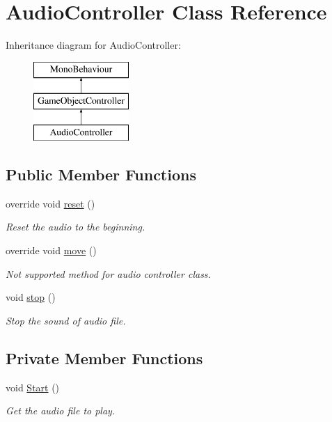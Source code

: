 \hypertarget{class_audio_controller}{}\section{Audio\+Controller Class Reference}
\label{class_audio_controller}
Inheritance diagram for Audio\+Controller\+:\begin{figure}[H]
\begin{center}
\leavevmode
\includegraphics[height=3.000000cm]{class_audio_controller}
\end{center}
\end{figure}
\subsection*{Public Member Functions}
\begin{DoxyCompactItemize}
\item 
override void \hyperlink{class_audio_controller_a20e52c6c93067e734270bbd3e1da204f}{reset} ()
\begin{DoxyCompactList}\small\item\em Reset the audio to the beginning. \end{DoxyCompactList}\item 
override void \hyperlink{class_audio_controller_af4b01a95141dabb50d0bc39cc3abb4e6}{move} ()
\begin{DoxyCompactList}\small\item\em Not supported method for audio controller class. \end{DoxyCompactList}\item 
void \hyperlink{class_audio_controller_aeac4b18138013f602f8f1d67cb5daa2e}{stop} ()
\begin{DoxyCompactList}\small\item\em Stop the sound of audio file. \end{DoxyCompactList}\end{DoxyCompactItemize}
\subsection*{Private Member Functions}
\begin{DoxyCompactItemize}
\item 
void \hyperlink{class_audio_controller_a9f54b63fdcc425116ff24c93775a1338}{Start} ()
\begin{DoxyCompactList}\small\item\em Get the audio file to play. \end{DoxyCompactList}\end{DoxyCompactItemize}
